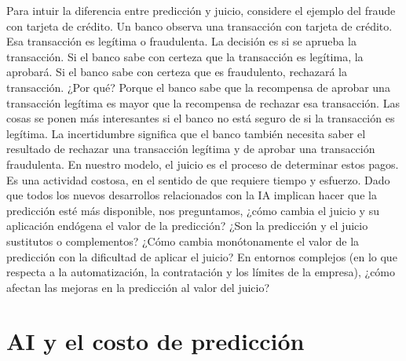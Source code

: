 Para intuir la diferencia entre predicción y juicio, considere el ejemplo del fraude con tarjeta de crédito. Un banco observa una transacción con tarjeta de crédito. Esa transacción es legítima o fraudulenta. La decisión es si se aprueba la transacción. Si el banco sabe con certeza que la transacción es legítima, la aprobará. Si el banco sabe con certeza que es fraudulento, rechazará la transacción. ¿Por qué? Porque el banco sabe que la recompensa de aprobar una transacción legítima es mayor que la recompensa de rechazar esa transacción. Las cosas se ponen más interesantes si el banco no está seguro de si la transacción es legítima. La incertidumbre significa que el banco también necesita saber el resultado de rechazar una transacción legítima y de aprobar una transacción fraudulenta. En nuestro modelo, el juicio es el proceso de determinar estos pagos. Es una actividad costosa, en el sentido de que requiere tiempo y esfuerzo. Dado que todos los nuevos desarrollos relacionados con la IA implican hacer que la predicción esté más disponible, nos preguntamos, ¿cómo cambia el juicio y su aplicación endógena el valor de la predicción? ¿Son la predicción y el juicio sustitutos o complementos? ¿Cómo cambia monótonamente el valor de la predicción con la dificultad de aplicar el juicio? En entornos complejos (en lo que respecta a la automatización, la contratación y los límites de la empresa), ¿cómo afectan las mejoras en la predicción al valor del juicio?\\
 
\section{AI y el costo de predicción}
